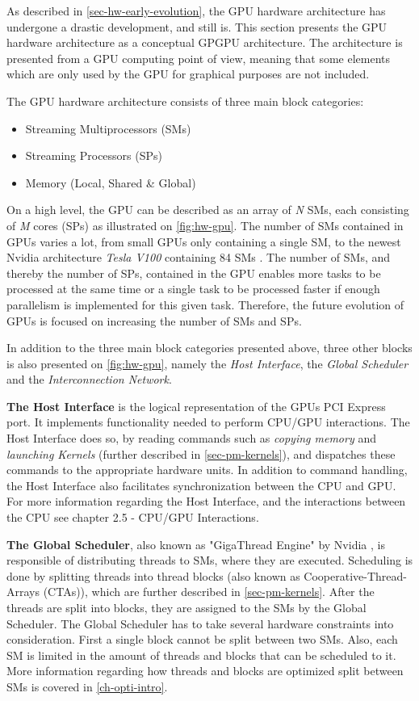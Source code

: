 As described in \cref{sec-hw-early-evolution}, the GPU hardware architecture has undergone a drastic development, and still is.
This section presents the GPU hardware architecture as a conceptual GPGPU architecture.
The architecture is presented from a GPU computing point of view, meaning that some elements which are only used by the GPU for graphical purposes are not included.

The GPU hardware architecture consists of three main block categories:
\begin{itemize}
	\item Streaming Multiprocessors (SMs)
	\item Streaming Processors (SPs) 
	\item Memory (Local, Shared \& Global)
\end{itemize}

On a high level, the GPU can be described as an array of \textit{N} SMs, each consisting of \textit{M} cores (SPs) as illustrated on \cref{fig:hw-gpu}. 
The number of SMs contained in GPUs varies a lot, from small GPUs only containing a single SM, to the newest Nvidia architecture \textit{Tesla V100} containing 84 SMs \cite{Nvidia2017}.
The number of SMs, and thereby the number of SPs, contained in the GPU enables more tasks to be processed at the same time or a single task to be processed faster if enough parallelism is implemented for this given task.
Therefore, the future evolution of GPUs is focused on increasing the number of SMs and SPs.

In addition to the three main block categories presented above, three other blocks is also presented on \cref{fig:hw-gpu}, namely the \textit{Host Interface}, the \textit{Global Scheduler} and the \textit{Interconnection Network}.

\textbf{The Host Interface} is the logical representation of the GPUs PCI Express port.
It implements functionality needed to perform CPU/GPU interactions. 
The Host Interface does so, by reading commands such as \textit{copying memory} and  \textit{launching Kernels} (further described in \cref{sec-pm-kernels}), and dispatches these commands to the appropriate hardware units.
In addition to command handling, the Host Interface also facilitates synchronization between the CPU and GPU. 
For more information regarding the Host Interface, and the interactions between the CPU see \cite{Wilt2013} chapter 2.5 - CPU/GPU Interactions.

\textbf{The Global Scheduler}, also known as "GigaThread Engine" by Nvidia \cite{Nvidia2009}, is responsible of distributing threads to SMs, where they are executed.
Scheduling is done by splitting threads into thread blocks (also known as Cooperative-Thread-Arrays (CTAs)), which are further described in \cref{sec-pm-kernels}.
After the threads are split into blocks, they are assigned to the SMs by the Global Scheduler.
The Global Scheduler has to take several hardware constraints into consideration.
First a single block cannot be split between two SMs.
Also, each SM is limited in the amount of threads and blocks that can be scheduled to it. 
More information regarding how threads and blocks are optimized split between SMs is covered in \cref{ch-opti-intro}.

